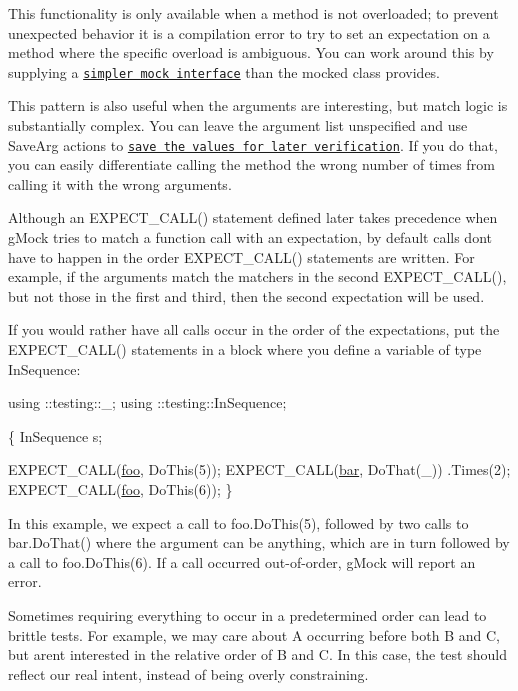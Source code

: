 This functionality is only available when a method is not overloaded; to prevent unexpected behavior it is a compilation error to try to set an expectation on a method where the specific overload is ambiguous. You can work around this by supplying a \href{#SimplerInterfaces}{\tt simpler mock interface} than the mocked class provides.

This pattern is also useful when the arguments are interesting, but match logic is substantially complex. You can leave the argument list unspecified and use Save\+Arg actions to \href{#SaveArgVerify}{\tt save the values for later verification}. If you do that, you can easily differentiate calling the method the wrong number of times from calling it with the wrong arguments.

Although an {\ttfamily E\+X\+P\+E\+C\+T\+\_\+\+C\+A\+L\+L()} statement defined later takes precedence when g\+Mock tries to match a function call with an expectation, by default calls don\textquotesingle{}t have to happen in the order {\ttfamily E\+X\+P\+E\+C\+T\+\_\+\+C\+A\+L\+L()} statements are written. For example, if the arguments match the matchers in the second {\ttfamily E\+X\+P\+E\+C\+T\+\_\+\+C\+A\+L\+L()}, but not those in the first and third, then the second expectation will be used.

If you would rather have all calls occur in the order of the expectations, put the {\ttfamily E\+X\+P\+E\+C\+T\+\_\+\+C\+A\+L\+L()} statements in a block where you define a variable of type {\ttfamily In\+Sequence}\+:


\begin{DoxyCode}
using ::testing::\_;
using ::testing::InSequence;

  \{
    InSequence s;

    EXPECT\_CALL(\mbox{\hyperlink{namespacefoo}{foo}}, DoThis(5));
    EXPECT\_CALL(\mbox{\hyperlink{namespacebar}{bar}}, DoThat(\_))
        .Times(2);
    EXPECT\_CALL(\mbox{\hyperlink{namespacefoo}{foo}}, DoThis(6));
  \}
\end{DoxyCode}


In this example, we expect a call to {\ttfamily foo.\+Do\+This(5)}, followed by two calls to {\ttfamily bar.\+Do\+That()} where the argument can be anything, which are in turn followed by a call to {\ttfamily foo.\+Do\+This(6)}. If a call occurred out-\/of-\/order, g\+Mock will report an error.

Sometimes requiring everything to occur in a predetermined order can lead to brittle tests. For example, we may care about {\ttfamily A} occurring before both {\ttfamily B} and {\ttfamily C}, but aren\textquotesingle{}t interested in the relative order of {\ttfamily B} and {\ttfamily C}. In this case, the test should reflect our real intent, instead of being overly constraining.

